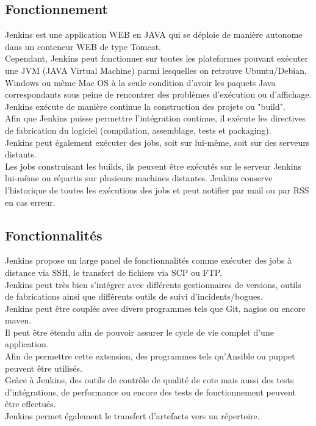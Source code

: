\documentclass[12pt]{article}
\begin{document}
\subsection{Fonctionnement}

Jenkins est une application WEB en JAVA qui se déploie de manière autonome dans un conteneur WEB de type Tomcat.
\\
Cependant, Jenkins peut fonctionner sur toutes les plateformes pouvant exécuter une JVM (JAVA Virtual Machine) parmi lesquelles on retrouve Ubuntu/Debian, Windows ou même Mac OS à la seule condition d'avoir les paquets Java correspondants sous peine de rencontrer des problèmes d'exécution ou d'affichage.
\\
Jenkins exécute de manière continue la construction des projets ou "build".
\\ 
Afin que Jenkins puisse permettre l'intégration continue, il exécute les directives de fabrication du logiciel (compilation, assemblage, tests et packaging).
\\
Jenkins peut également exécuter des jobs, soit sur lui-même, soit sur des serveurs distants.
\\
Les jobs construisant les builds, ils peuvent être exécutés sur le serveur Jenkins lui-même ou répartis sur plusieurs machines distantes. Jenkins conserve l'historique de toutes les exécutions des jobs et peut notifier par mail ou par RSS en cas erreur.

\subsection{Fonctionnalités}
Jenkins propose un large panel de fonctionnalités comme exécuter des jobs à distance via SSH, le transfert de fichiers via SCP ou FTP. 
\\
Jenkins peut très bien s'intégrer avec différents gestionnaires de versions, outils de fabrications ainsi que différents outils de suivi d'incidents/bogues. 
\\
Jenkins peut être couplés avec divers programmes tels que Git, nagios ou encore maven.
\\
Il peut être étendu afin de pouvoir assurer le cycle de vie complet d'une application.
\\
Afin de permettre cette extension, des programmes tels qu'Ansible ou puppet peuvent être utilisés.
\\
Grâce à Jenkins, des outils de contrôle de qualité de cote mais aussi des tests d'intégrations, de performance ou encore des tests de fonctionnement peuvent être effectués.
\\
Jenkins permet également le transfert d'artefacts vers un répertoire.
\end{document}
